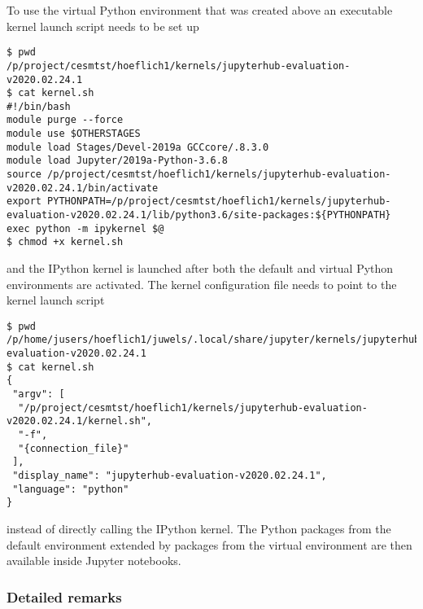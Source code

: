 \documentclass[11pt,a4paper]{article}
\begin{document}
To use the virtual Python environment that was created above an executable kernel launch script needs to be set up
%
\begin{verbatim}
$ pwd
/p/project/cesmtst/hoeflich1/kernels/jupyterhub-evaluation-v2020.02.24.1
$ cat kernel.sh
#!/bin/bash
module purge --force
module use $OTHERSTAGES
module load Stages/Devel-2019a GCCcore/.8.3.0
module load Jupyter/2019a-Python-3.6.8
source /p/project/cesmtst/hoeflich1/kernels/jupyterhub-evaluation-v2020.02.24.1/bin/activate
export PYTHONPATH=/p/project/cesmtst/hoeflich1/kernels/jupyterhub-evaluation-v2020.02.24.1/lib/python3.6/site-packages:${PYTHONPATH}
exec python -m ipykernel $@
$ chmod +x kernel.sh
\end{verbatim}
%
and the IPython kernel is launched after both the default and virtual Python environments are activated.
The kernel configuration file needs to point to the kernel launch script
%
\begin{verbatim}
$ pwd
/p/home/jusers/hoeflich1/juwels/.local/share/jupyter/kernels/jupyterhub-evaluation-v2020.02.24.1
$ cat kernel.sh
{
 "argv": [
  "/p/project/cesmtst/hoeflich1/kernels/jupyterhub-evaluation-v2020.02.24.1/kernel.sh",
  "-f",
  "{connection_file}"
 ],
 "display_name": "jupyterhub-evaluation-v2020.02.24.1",
 "language": "python"
}
\end{verbatim}
%
instead of directly calling the IPython kernel.
The Python packages from the default environment extended by packages from the virtual environment are then available inside Jupyter notebooks.

\subsubsection{Detailed remarks}
\end{document}
